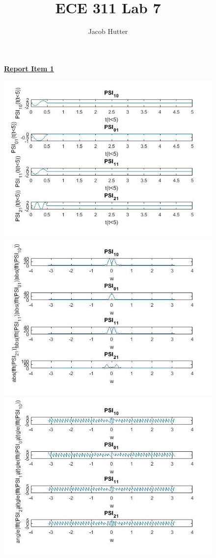 \documentclass{article}
\author{Jacob Hutter}
\title{ECE 311 Lab 7}
\begin{document}
\maketitle

\begin{figure}[H]
\color{red}
\underline{\textbf{Report Item 1}}
\color{black}

\includegraphics[scale=.5]{1}
\includegraphics[scale=.5]{1_magnitude}
\includegraphics[scale=.5]{1_phase}
\end{figure}
\end{document}

